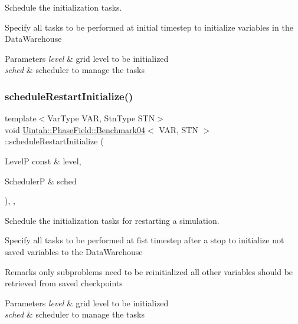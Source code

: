 Schedule the initialization tasks. 

Specify all tasks to be performed at initial timestep to initialize variables in the Data\+Warehouse


\begin{DoxyParams}{Parameters}
{\em level} & grid level to be initialized \\
\hline
{\em sched} & scheduler to manage the tasks \\
\hline
\end{DoxyParams}
\mbox{\label{classUintah_1_1PhaseField_1_1Benchmark04_a52b5b59cd0428de443f88c506221df14}} 
\subsubsection{\texorpdfstring{schedule\+Restart\+Initialize()}{scheduleRestartInitialize()}}
{\footnotesize\ttfamily template$<$Var\+Type V\+AR, Stn\+Type S\+TN$>$ \\
void \hyperlink{classUintah_1_1PhaseField_1_1Benchmark04}{Uintah\+::\+Phase\+Field\+::\+Benchmark04}$<$ V\+AR, S\+TN $>$\+::schedule\+Restart\+Initialize (\begin{DoxyParamCaption}\item[{LevelP const \&}]{level,  }\item[{SchedulerP \&}]{sched }\end{DoxyParamCaption})\hspace{0.3cm}{\ttfamily [override]}, {\ttfamily [protected]}, {\ttfamily [virtual]}}



Schedule the initialization tasks for restarting a simulation. 

Specify all tasks to be performed at fist timestep after a stop to initialize not saved variables to the Data\+Warehouse

\begin{DoxyRemark}{Remarks}
only subproblems need to be reinitialized all other variables should be retrieved from saved checkpoints
\end{DoxyRemark}

\begin{DoxyParams}{Parameters}
{\em level} & grid level to be initialized \\
\hline
{\em sched} & scheduler to manage the tasks \\
\hline
\end{DoxyParams}
\mbox{\label{classUintah_1_1PhaseField_1_1Benchmark04_ac02ffdab67acde76dd275583c6d2c2dd}} 
